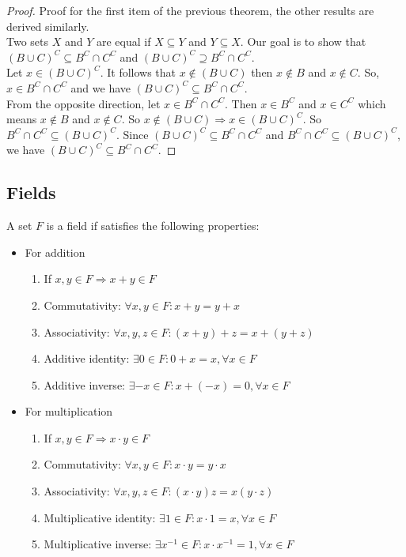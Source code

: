\begin{proof}
    Proof for the first item of the previous theorem, the other results are derived similarly.\\
    Two sets $X$ and $Y$ are equal if $X \subseteq Y$ and $Y \subseteq X$. Our goal is to show that $(B \cup C)^C \subseteq B^C \cap C^C$ and $(B \cup C)^C \supseteq B^C \cap C^C$. \\
    Let $x \in (B \cup C)^C$. It follows that $x \notin (B \cup C)$ then $x \notin B$ and $x \notin C$. So, $x \in B^C \cap C^C$ and we have $(B \cup C)^C \subseteq B^C \cap C^C$. \\
    From the opposite direction, let  $x \in B^C \cap C^C$. Then $x \in B^C$ and $x \in C^C$ which means $x \notin B$ and $x \notin C$. So $x \notin (B \cup C) \Rightarrow x \in (B \cup C)^C$. So $B^C \cap C^C \subseteq (B \cup C)^C$.
    Since $(B \cup C)^C \subseteq B^C \cap C^C$ and $B^C \cap C^C \subseteq (B \cup C)^C$, we have $(B \cup C)^C \subseteq B^C \cap C^C$.
\end{proof}

\subsection{Fields}

\begin{definition}[Field]
    A set $F$ is a field if satisfies the following properties:
    \begin{itemize}
        \item For addition
            \begin{enumerate}
                \item If $x, y \in F \Rightarrow x + y \in F$
                \item Commutativity: $\forall x, y \in F: x + y = y + x$
                \item Associativity: $\forall x, y, z \in F: (x+y) + z = x + (y + z)$
                \item Additive identity: $\exists 0 \in F: 0 + x = x, \forall x \in F$
                \item Additive inverse: $\exists -x \in F: x + (-x) = 0, \forall x \in F$
            \end{enumerate}
        \item For multiplication
            \begin{enumerate}
                \item If $x, y \in F \Rightarrow x \cdot y \in F$
                \item Commutativity: $\forall x, y \in F: x \cdot y = y \cdot x$
                \item Associativity: $\forall x,y, z \in F: (x\cdot y) z = x (y \cdot z)$
                \item Multiplicative identity: $\exists 1 \in F: x \cdot 1 = x, \forall x \in F$
                \item Multiplicative inverse: $\exists x^{-1} \in F: x \cdot x^{-1} = 1, \forall x \in F$
            \end{enumerate}
    \end{itemize}
\end{definition}

